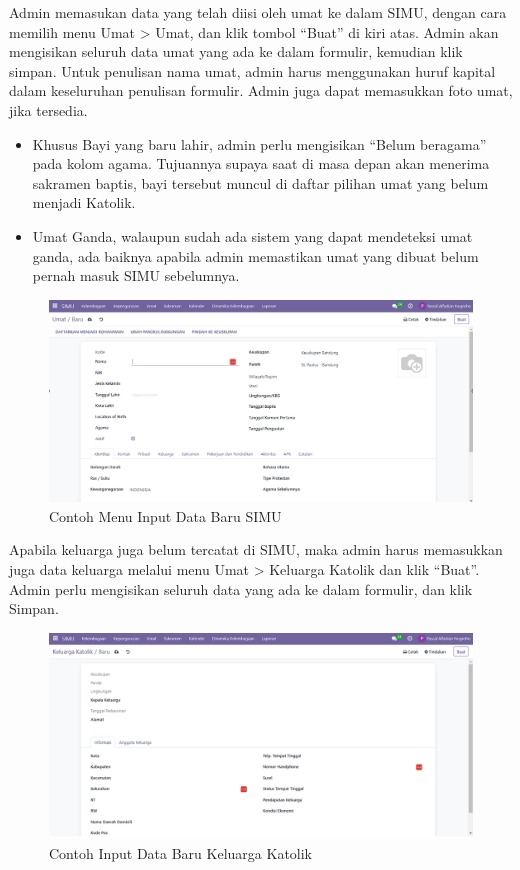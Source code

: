 Admin memasukan data yang telah diisi oleh umat ke dalam SIMU, dengan cara memilih menu Umat > Umat, dan klik tombol “Buat” di kiri atas. Admin akan mengisikan seluruh data umat yang ada ke dalam formulir, kemudian klik simpan. Untuk penulisan nama umat, admin harus menggunakan huruf kapital dalam keseluruhan penulisan formulir. Admin juga dapat memasukkan foto umat, jika tersedia.

\begin{itemize}
	\item Khusus Bayi yang baru lahir, admin perlu mengisikan “Belum beragama” pada kolom agama. Tujuannya supaya saat di masa depan akan menerima sakramen baptis, bayi tersebut muncul di daftar pilihan umat yang belum menjadi Katolik.
	
	\item Umat Ganda, walaupun sudah ada sistem yang dapat mendeteksi umat ganda, ada baiknya apabila admin memastikan umat yang dibuat belum pernah masuk SIMU sebelumnya. 
\end{itemize}

\begin{figure}[H]
	\centering
	\includegraphics[scale=0.5]{Gambar/simuInput.png}
	\caption{Contoh Menu Input Data Baru SIMU} 
	\label{fig:simuInput}
\end{figure}

Apabila keluarga juga belum tercatat di SIMU, maka admin harus memasukkan juga data keluarga melalui menu Umat > Keluarga Katolik dan klik “Buat”. Admin perlu mengisikan seluruh data yang ada ke dalam formulir, dan klik Simpan.

\begin{figure}[H]
	\centering
	\includegraphics[scale=0.50]{Gambar/simuKeluarga.png}
	\caption{Contoh Input Data Baru Keluarga Katolik} 
	\label{fig:simuKeluarga}
\end{figure}

